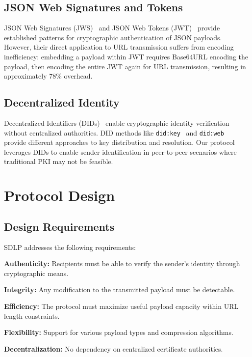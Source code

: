 \documentclass[conference]{IEEEtran}
\begin{document}
\subsection{JSON Web Signatures and Tokens}

JSON Web Signatures (JWS)~\cite{rfc7515} and JSON Web Tokens (JWT)~\cite{rfc7519} provide established patterns for cryptographic authentication of JSON payloads. However, their direct application to URL transmission suffers from encoding inefficiency: embedding a payload within JWT requires Base64URL encoding the payload, then encoding the entire JWT again for URL transmission, resulting in approximately 78\% overhead.

\subsection{Decentralized Identity}

Decentralized Identifiers (DIDs)~\cite{w3c-did-core} enable cryptographic identity verification without centralized authorities. DID methods like \texttt{did:key}~\cite{did-key-spec} and \texttt{did:web}~\cite{did-web-spec} provide different approaches to key distribution and resolution. Our protocol leverages DIDs to enable sender identification in peer-to-peer scenarios where traditional PKI may not be feasible.

\section{Protocol Design}

\subsection{Design Requirements}

SDLP addresses the following requirements:

\textbf{Authenticity:} Recipients must be able to verify the sender's identity through cryptographic means.

\textbf{Integrity:} Any modification to the transmitted payload must be detectable.

\textbf{Efficiency:} The protocol must maximize useful payload capacity within URL length constraints.

\textbf{Flexibility:} Support for various payload types and compression algorithms.

\textbf{Decentralization:} No dependency on centralized certificate authorities.
\end{document}
